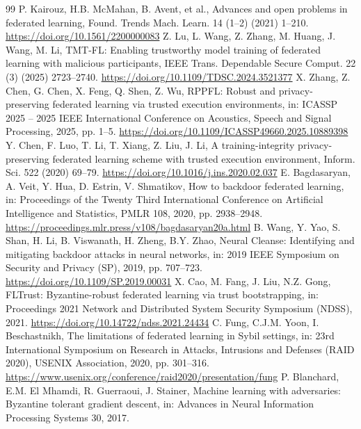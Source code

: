 \documentclass[final,5p,times,twocolumn]{elsarticle/elsarticle}
\begin{document}
\begin{thebibliography}{99}
     P. Kairouz, H.B. McMahan, B. Avent, et al., Advances and open problems in federated learning, Found. Trends Mach. Learn. 14 (1--2) (2021) 1--210. \url{https://doi.org/10.1561/2200000083}
     Z. Lu, L. Wang, Z. Zhang, M. Huang, J. Wang, M. Li, TMT-FL: Enabling trustworthy model training of federated learning with malicious participants, IEEE Trans. Dependable Secure Comput. 22 (3) (2025) 2723--2740. \url{https://doi.org/10.1109/TDSC.2024.3521377}
     X. Zhang, Z. Chen, G. Chen, X. Feng, Q. Shen, Z. Wu, RPPFL: Robust and privacy-preserving federated learning via trusted execution environments, in: ICASSP 2025 -- 2025 IEEE International Conference on Acoustics, Speech and Signal Processing, 2025, pp. 1--5. \url{https://doi.org/10.1109/ICASSP49660.2025.10889398}
     Y. Chen, F. Luo, T. Li, T. Xiang, Z. Liu, J. Li, A training-integrity privacy-preserving federated learning scheme with trusted execution environment, Inform. Sci. 522 (2020) 69--79. \url{https://doi.org/10.1016/j.ins.2020.02.037}
     E. Bagdasaryan, A. Veit, Y. Hua, D. Estrin, V. Shmatikov, How to backdoor federated learning, in: Proceedings of the Twenty Third International Conference on Artificial Intelligence and Statistics, PMLR 108, 2020, pp. 2938--2948. \url{https://proceedings.mlr.press/v108/bagdasaryan20a.html}
     B. Wang, Y. Yao, S. Shan, H. Li, B. Viswanath, H. Zheng, B.Y. Zhao, Neural Cleanse: Identifying and mitigating backdoor attacks in neural networks, in: 2019 IEEE Symposium on Security and Privacy (SP), 2019, pp. 707--723. \url{https://doi.org/10.1109/SP.2019.00031}
     X. Cao, M. Fang, J. Liu, N.Z. Gong, FLTrust: Byzantine-robust federated learning via trust bootstrapping, in: Proceedings 2021 Network and Distributed System Security Symposium (NDSS), 2021. \url{https://doi.org/10.14722/ndss.2021.24434}
     C. Fung, C.J.M. Yoon, I. Beschastnikh, The limitations of federated learning in Sybil settings, in: 23rd International Symposium on Research in Attacks, Intrusions and Defenses (RAID 2020), USENIX Association, 2020, pp. 301--316. \url{https://www.usenix.org/conference/raid2020/presentation/fung}
     P. Blanchard, E.M. El Mhamdi, R. Guerraoui, J. Stainer, Machine learning with adversaries: Byzantine tolerant gradient descent, in: Advances in Neural Information Processing Systems 30, 2017.

\end{thebibliography}
\end{document}

